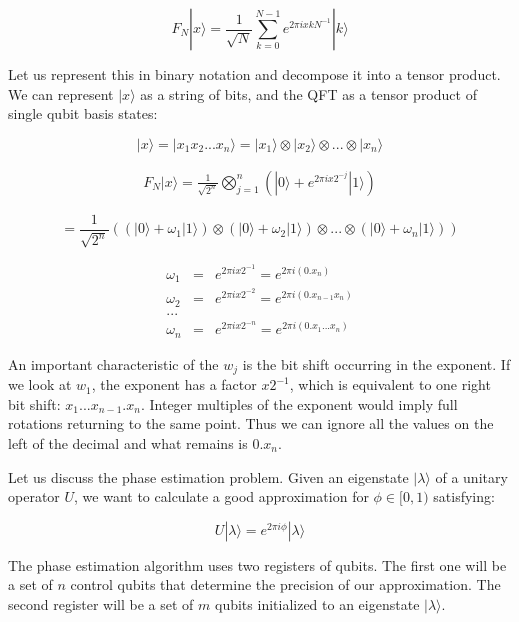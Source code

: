 \documentclass[msc,oneside]{ubcthesis}
\begin{document}
	$$ F_N |x \rangle = \frac{1}{\sqrt{N}} \sum_{k=0}^{N-1} e^{2\pi i x k N^{-1}} |k\rangle $$
	
	Let us represent this in binary notation and decompose it into a tensor product. We can represent $|x\rangle$ as a string of bits, and the QFT as a tensor product of single qubit basis states:
	
	$$|x\rangle = |x_1x_2 ... x_n\rangle =  |x_1\rangle \otimes |x_2\rangle \otimes ... \otimes |x_n\rangle$$
	
	\begin{eqnarray}
		F_N |x \rangle = \frac{1}{\sqrt{2^n}} \bigotimes_{j=1}^n (|0\rangle +  e^{2\pi i x  2^{-j}} |1\rangle)
	\end{eqnarray}
	
	$$= \frac{1}{\sqrt{2^n}} ((|0\rangle + \omega_1|1\rangle)  \otimes(|0\rangle + \omega_2|1\rangle)\otimes ... \otimes(|0\rangle + \omega_n|1\rangle))$$
	
	
	\begin{eqnarray*}
		\omega_1 &=& e^{2\pi i x 2^{-1}} =  e^{2\pi i (0.x_n)}\\
		\omega_2 &=& e^{2\pi i x 2^{-2}} =  e^{2\pi i (0.x_{n-1}x_n)}\\
		...\\
		\omega_n &=& e^{2\pi i x 2^{-n}} =  e^{2\pi i (0.x_1...x_n)}
	\end{eqnarray*}
	
	
	An important characteristic of the $w_j$ is the bit shift occurring in the exponent. If we look at $w_1$, the exponent has a factor $x 2^{-1}$, which is equivalent to one right bit shift: $x_1...x_{n-1}.x_n$. Integer multiples of the exponent would imply full rotations returning to the same point. Thus we can ignore all the values on the left of the decimal and what remains is $0.x_n$. 
	
	
	
	Let us discuss the phase estimation problem. Given an eigenstate $|\lambda \rangle$ of a unitary operator $U$, we want to calculate a good approximation  for $\phi \in [0,1)$ satisfying:
	
	\begin{equation}
		U |\lambda \rangle = e^{2\pi i \phi} |\lambda \rangle
	\end{equation}
	
	The phase estimation algorithm uses two registers of qubits. The first one will be a set of $n$ control qubits that determine the precision of our approximation. The second register will be a set of $m$ qubits initialized to an eigenstate $|\lambda\rangle$.
	
\end{document}
